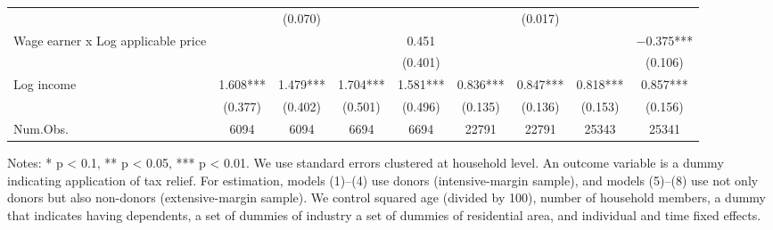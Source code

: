 \begin{landscape}
\begin{table}
\begin{threeparttable}
\begin{tabular}[t]{lcccccccc}
 &  & (\num{0.070}) &  &  &  & (\num{0.017}) &  & \\
Wage earner x Log applicable price &  &  &  & \num{0.451} &  &  &  & \num{-0.375}***\\
 &  &  &  & (\num{0.401}) &  &  &  & (\num{0.106})\\
Log income & \num{1.608}*** & \num{1.479}*** & \num{1.704}*** & \num{1.581}*** & \num{0.836}*** & \num{0.847}*** & \num{0.818}*** & \num{0.857}***\\
 & (\num{0.377}) & (\num{0.402}) & (\num{0.501}) & (\num{0.496}) & (\num{0.135}) & (\num{0.136}) & (\num{0.153}) & (\num{0.156})\\
\midrule
Num.Obs. & \num{6094} & \num{6094} & \num{6694} & \num{6694} & \num{22791} & \num{22791} & \num{25343} & \num{25341}\\
\bottomrule
\end{tabular}
\begin{tablenotes}
\item Notes: * p < 0.1, ** p < 0.05, *** p < 0.01. We use standard errors clustered at household level. An outcome variable is a dummy indicating application of tax relief. For estimation, models (1)--(4) use donors (intensive-margin sample), and models (5)--(8) use not only donors but also non-donors (extensive-margin sample).  We control squared age (divided by 100), number of household members, a dummy that indicates having dependents, a set of dummies of industry a set of dummies of residential area, and individual and time fixed effects.
\end{tablenotes}
\end{threeparttable}
\end{table}
\end{landscape}

